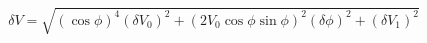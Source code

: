 \begin{equation}
\label{eq:delta_V_Malus}
\delta V = \sqrt{ \left(\cos{\phi}\right)^4(\delta V_0)^2 + \left(2V_0 \cos{\phi}\sin{\phi} \right)^2(\delta \phi)^2+ (\delta V_1)^2}
\end{equation}
